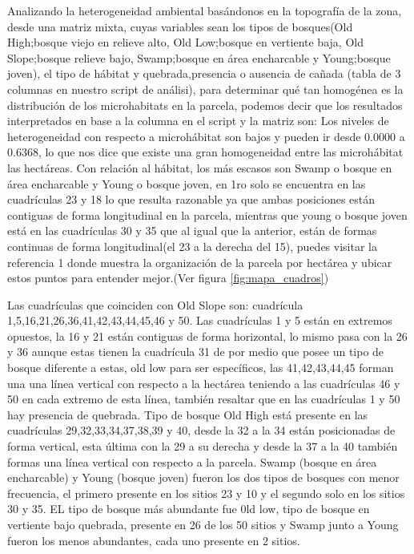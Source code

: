 \documentclass[11pt,]{article}
\begin{document}
Analizando la heterogeneidad ambiental basándonos en la topografía de la
zona, desde una matriz mixta, cuyas variables sean los tipos de
bosques(Old High;bosque viejo en relieve alto, Old Low;bosque en
vertiente baja, Old Slope;bosque relieve bajo, Swamp;bosque en área
encharcable y Young;bosque joven), el tipo de hábitat y
quebrada,presencia o ausencia de cañada (tabla de 3 columnas en nuestro
script de análisi), para determinar qué tan homogénea es la distribución
de los microhabitats en la parcela, podemos decir que los resultados
interpretados en base a la columna en el script y la matriz son: Los
niveles de heterogeneidad con respecto a microhábitat son bajos y pueden
ir desde 0.0000 a 0.6368, lo que nos dice que existe una gran
homogeneidad entre las microhábitat las hectáreas. Con relación al
hábitat, los más escasos son Swamp o bosque en área encharcable y Young
o bosque joven, en 1ro solo se encuentra en las cuadrículas 23 y 18 lo
que resulta razonable ya que ambas posiciones están contiguas de forma
longitudinal en la parcela, mientras que young o bosque joven está en
las cuadrículas 30 y 35 que al igual que la anterior, están de formas
continuas de forma longitudinal(el 23 a la derecha del 15), puedes
visitar la referencia 1 donde muestra la organización de la parcela por
hectárea y ubicar estos puntos para entender mejor.(Ver figura
\ref{fig:mapa_cuadros})

Las cuadrículas que coinciden con Old Slope son: cuadrícula
1,5,16,21,26,36,41,42,43,44,45,46 y 50. Las cuadrículas 1 y 5 están en
extremos opuestos, la 16 y 21 están contiguas de forma horizontal, lo
mismo pasa con la 26 y 36 aunque estas tienen la cuadrícula 31 de por
medio que posee un tipo de bosque diferente a estas, old low para ser
específicos, las 41,42,43,44,45 forman una una línea vertical con
respecto a la hectárea teniendo a las cuadrículas 46 y 50 en cada
extremo de esta línea, también resaltar que en las cuadrículas 1 y 50
hay presencia de quebrada. Tipo de bosque Old High está presente en las
cuadrículas 29,32,33,34,37,38,39 y 40, desde la 32 a la 34 están
posicionadas de forma vertical, esta última con la 29 a su derecha y
desde la 37 a la 40 también formas una línea vertical con respecto a la
parcela. Swamp (bosque en área encharcable) y Young (bosque joven)
fueron los dos tipos de bosques con menor frecuencia, el primero
presente en los sitios 23 y 10 y el segundo solo en los sitios 30 y 35.
EL tipo de bosque más abundante fue 0ld low, tipo de bosque en vertiente
bajo quebrada, presente en 26 de los 50 sitios y Swamp junto a Young
fueron los menos abundantes, cada uno presente en 2 sitios.
\end{document}
